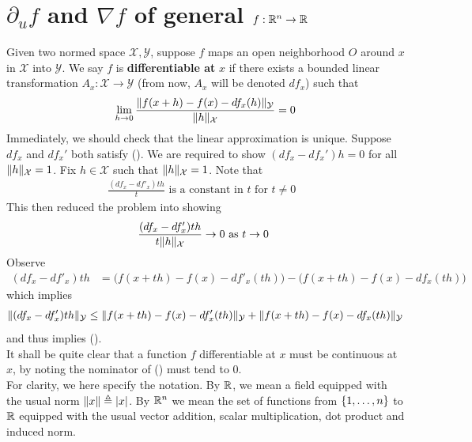 \documentclass{report}
\begin{document}
\section{$\partial_u f$ and $\nabla f$ of general $f:\mathbb{R}^n\rightarrow \mathbb{R}$}
\begin{mdframed}
Given two normed space $\mathcal{X},\mathcal{Y}$, suppose $f$ maps an open neighborhood $O$ around $x$ in $\mathcal{X}$ into $\mathcal{Y}$. We say $f$ is \textbf{differentiable at} $x$ if there exists a bounded linear transformation $A_x:\mathcal{X}\rightarrow \mathcal{Y}$ (from now, $A_x$ will be denoted $df_x$) such that  
\begin{align}
\label{defdi}
  \lim_{h\to 0} \frac{\| f(x+h)-f(x)-df_x(h) \|_\mathcal{Y}}{\| h \|_\mathcal{X}}=0 
\end{align}
Immediately, we should check that the linear approximation is unique. Suppose $df_x$ and  $df_x'$ both satisfy (). We are required to show $(df_x-df_x')h=0$ for all $\| h \|_\mathcal{X}=1$. Fix $h\in \mathcal{X}$ such that $\| h \|_\mathcal{X}=1$. Note that 
\begin{align*}
 \frac{(df_x-df'_x)th}{t}\text{ is a constant in $t$ for $t\neq 0$ }
\end{align*}
This then reduced the problem into showing 
\begin{align}
\label{goaldib}
\frac{(df_x-df'_x)th}{t\| h \|_{\mathcal{X}}}\to 0\text{ as $t\to 0$ }
\end{align}
Observe 
\begin{align*}
  (df_x-df'_x)th&= \Big( f(x+th)-f(x)-df'_x(th)\Big) - \Big(f(x+th)-f(x)-df_x(th) \Big)
\end{align*}
which implies 
\begin{align*}
\| (df_x-df_x')th \|_\mathcal{Y}\leq \| f(x+th)-f(x)-df'_x(th) \|_{\mathcal{Y}}+ \| f(x+th)-f(x)-df_x(th) \|_\mathcal{Y}
\end{align*}
and thus implies ().\\

It shall be quite clear that a function $f$ differentiable at $x$ must be continuous at $x$, by noting the nominator of () must tend to $0$.\\

For clarity, we here specify the notation. By $\mathbb{R}$, we mean a field equipped with the usual norm $\| x \|\triangleq \left|x\right|$. By  $\mathbb{R}^n$ we mean the set of functions from $\{ 1,\dots ,n \}$ to $\mathbb{R}$ equipped with the usual vector addition, scalar multiplication, dot product and induced norm. 
\end{mdframed}
\end{document}
